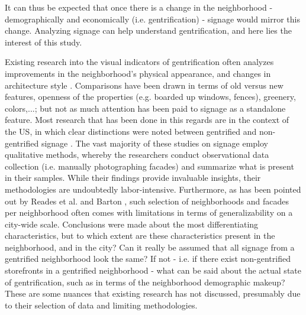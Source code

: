 It can thus be expected that once there is a change in the neighborhood - demographically and economically (i.e. gentrification) - signage would mirror this change. Analyzing signage can help understand gentrification, and here lies the interest of this study.

Existing research into the visual indicators of gentrification often analyzes improvements in the neighborhood's physical appearance, and changes in architecture style \cite{huang_detecting_2022, ravuri_gsv_2022, naik_computer_2017, ilic_deepmap_2019}. Comparisons have been drawn in terms of old versus new features, openness of the properties (e.g. boarded up windows, fences), greenery, colors,...; but not as much attention has been paid to signage as a standalone feature. Most research that has been done in this regards are in the context of the US, in which clear distinctions were noted between gentrified and non-gentrified signage \cite{trinch_signsays_2017, snajdr_oldschool_2018, snajdr_preserve_2022, rahman_signage_2020}. The vast majority of these studies on signage employ qualitative methods, whereby the researchers conduct observational data collection (i.e. manually photographing facades) and summarize what is present in their samples. While their findings provide invaluable insights, their methodologies are undoubtedly labor-intensive. Furthermore, as has been pointed out by Reades et al. \cite{reades_understanding_2019} and Barton \cite{barton_exploration_2016}, such selection of neighborhoods and facades per neighborhood often comes with limitations in terms of generalizability on a city-wide scale. Conclusions were made about the most differentiating characteristics, but to which extent are these characteristics present in the neighborhood, and in the city? Can it really be assumed that all signage from a gentrified neighborhood look the same? If not - i.e. if there exist non-gentrified storefronts in a gentrified neighborhood - what can be said about the actual state of gentrification, such as in terms of the neighborhood demographic makeup? These are some nuances that existing research has not discussed, presumably due to their selection of data and limiting methodologies.

